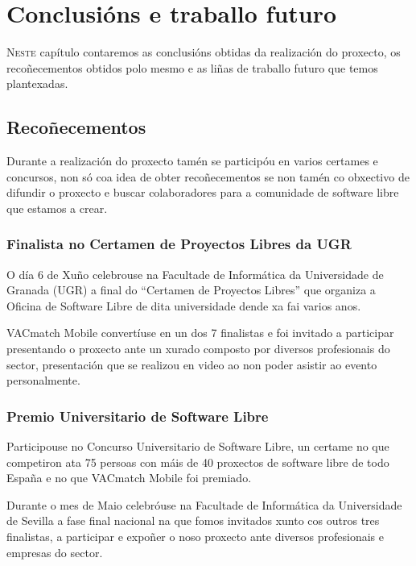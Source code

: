 \chapter{Conclusións e traballo futuro}
\minitoc


  \lettrine{N}{este} capítulo contaremos as conclusións obtidas da 
realización do proxecto, os recoñecementos obtidos polo mesmo e as liñas de 
traballo futuro que temos plantexadas.

\section{Recoñecementos}

Durante a realización do proxecto tamén se participóu en varios certames e 
concursos, non só coa idea de obter recoñecementos se non tamén co obxectivo de 
difundir o proxecto e buscar colaboradores para a comunidade de software libre 
que estamos a crear.

  \subsection{Finalista no Certamen de Proyectos Libres da UGR}
  O día 6 de Xuño celebrouse na Facultade de Informática da Universidade de 
Granada (UGR) a final do ``Certamen de Proyectos Libres'' que organiza a 
Oficina de Software Libre de dita universidade dende xa fai varios anos.

  VACmatch Mobile convertíuse en un dos 7 finalistas e foi invitado a 
participar presentando o proxecto ante un xurado composto por diversos 
profesionais do sector, presentación que se realizou en video ao non 
poder asistir ao evento personalmente.

  \subsection{Premio Universitario de Software Libre}
  Participouse no Concurso Universitario de Software Libre, un certame no que 
competiron ata 75 persoas con máis de 40 proxectos de software libre de todo 
España e no que VACmatch Mobile foi premiado.

  Durante o mes de Maio celebróuse na Facultade de Informática da Universidade 
de Sevilla a fase final nacional na que fomos invitados xunto cos 
outros tres finalistas, a participar e expoñer o noso proxecto ante diversos 
profesionais e empresas do sector.

